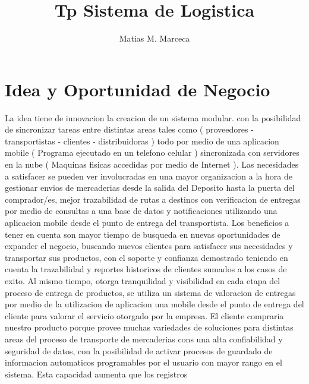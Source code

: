 \documentclass[
10pt, %
a4paper, %
oneside, %
headinclude,footinclude, %
BCOR5mm, %
]{scrartcl}
\title{Tp Sistema de Logistica}
\author{Matias M. Marceca}
\date{}
\begin{document}
\maketitle
\tableofcontents
\pagebreak

\section{Idea y Oportunidad de Negocio}
La idea tiene de innovacion la creacion de un sistema modular.
con la posibilidad de sincronizar tareas entre distintas areas
tales como ( proveedores - transportistas - clientes - distribuidoras )
todo por medio de una aplicacion mobile ( Programa ejecutado en un telefono
celular ) sincronizada con servidores en la nube ( Maquinas fisicas accedidas
por medio de Internet ).
\newline\newline
Las necesidades a satisfacer se pueden ver involucradas en una  mayor
organizacion a la hora de gestionar envios de mercaderias desde la salida
del Deposito hasta la puerta del comprador/es,  mejor trazabilidad de
rutas a destinos con verificacion de entregas por medio de consultas a una
base de datos y notificaciones utilizando una aplicacion mobile desde el
punto de entrega del transportista.
\newline\newline
Los beneficios a tener en cuenta son mayor tiempo de busqueda en nuevas
oportunidades de expander el negocio, buscando nuevos clientes para satisfacer
sus necesidades y transportar sus productos, con el soporte y confianza demostrado
teniendo en cuenta la trazabilidad y reportes historicos de clientes sumados
a los casos de exito.
\newline\newline
Al mismo tiempo, otorga tranquilidad y visibilidad en cada etapa del
proceso de entrega de productos, se utiliza un sistema de valoracion de
entregas por medio de la utilizacion de aplicacion una mobile desde el
punto de entrega del cliente para valorar el servicio otorgado por la empresa.
\newline\newline
El cliente compraria nuestro producto porque provee muchas variedades de
soluciones para distintas areas del proceso de transporte de mercaderias cons
una alta confiabilidad y seguridad de datos, con la posibilidad de activar
procesos de guardado de informacion automaticos programables por el usuario
con mayor rango en el sistema. Esta capacidad aumenta que los registros
\end{document}
